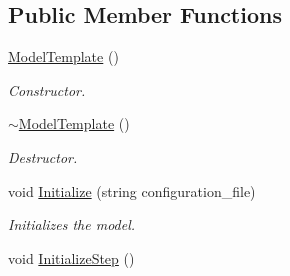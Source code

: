 \documentclass{tufte-book}
\begin{document}
\subsection{\-Public \-Member \-Functions}
\begin{DoxyCompactItemize}
\item
\hypertarget{class_verdandi_1_1_model_template_a00cad2113808cca9aabb01186b8341da}{
\hyperlink{class_verdandi_1_1_model_template_a00cad2113808cca9aabb01186b8341da}{\-Model\-Template} ()}
\label{class_verdandi_1_1_model_template_a00cad2113808cca9aabb01186b8341da}

\begin{DoxyCompactList}\small\item\em \-Constructor. \end{DoxyCompactList}\item
\hypertarget{class_verdandi_1_1_model_template_a45e5f8cc1b78eac465da8c8cd8e7d1f5}{
\hyperlink{class_verdandi_1_1_model_template_a45e5f8cc1b78eac465da8c8cd8e7d1f5}{$\sim$\-Model\-Template} ()}
\label{class_verdandi_1_1_model_template_a45e5f8cc1b78eac465da8c8cd8e7d1f5}

\begin{DoxyCompactList}\small\item\em \-Destructor. \end{DoxyCompactList}\item
void \hyperlink{class_verdandi_1_1_model_template_a986ea8e6681bff1219716418a351fab0}{\-Initialize} (string configuration\-\_\-file)
\begin{DoxyCompactList}\small\item\em \-Initializes the model. \end{DoxyCompactList}\item
\hypertarget{class_verdandi_1_1_model_template_a88d02538f57aa4af33c29d5322624e24}{
void \hyperlink{class_verdandi_1_1_model_template_a88d02538f57aa4af33c29d5322624e24}{\-Initialize\-Step} ()}
\label{class_verdandi_1_1_model_template_a88d02538f57aa4af33c29d5322624e24}


\end{DoxyCompactItemize}
\end{document}

